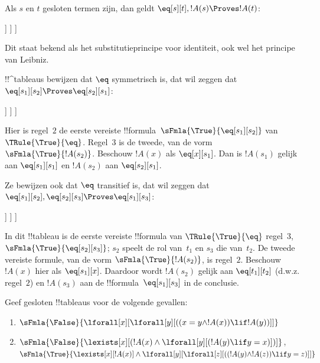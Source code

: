 \documentclass[openany]{memoir}
\begin{document}
\begin{ex}
Als $s$ en $t$ gesloten termen zijn, dan geldt
$\eq[s][t], !A(s) \Proves !A(t)$:
\begin{oltableau}
  [\sFmla{\False}{\formula{A}(t)}, just = \TAss
    [\sFmla{\True}{\eq[s][t]}, just = \TAss
      [\sFmla{\True}{\formula{A}(s)}, just = \TAss
        [\sFmla{\True}{\formula{A}(t)}, just={\TRule{\True}{\eq}[2, 3]}, close]
      ]
    ]
  ]
\end{oltableau}
Dit staat bekend als het substitutieprincipe voor identiteit, ook wel
het principe van Leibniz.

!!^{tableau}s bewijzen dat $\eq$ symmetrisch is, dat wil zeggen dat
$\eq[s_1][s_2] \Proves \eq[s_2][s_1]$:
\begin{oltableau}
  [\sFmla{\False}{\eq[s_2][s_1]}, just = \TAss
    [\sFmla{\True}{\eq[s_1][s_2]}, just = \TAss
      [\sFmla{\True}{\eq[s_1][s_1]}, just = {$\eq$}
        [\sFmla{\True}{\eq[s_2][s_1]}, just = {\TRule{\True}{\eq}[2, 3]}, close]
      ]
    ]
  ]
\end{oltableau}
Hier is regel~$2$ de eerste vereiste
!!{formula}~$\sFmla{\True}{\eq[s_1][s_2]}$ van
$\TRule{\True}{\eq}$. Regel~$3$ is de tweede, van de vorm
$\sFmla{\True}{!A(s_2)}$. Beschouw $!A(x)$ als $\eq[x][s_1]$. Dan is
$!A(s_1)$ gelijk aan $\eq[s_1][s_1]$ en $!A(s_2)$ aan
$\eq[s_2][s_1]$.

Ze bewijzen ook dat $\eq$ transitief is, dat wil zeggen dat
$\eq[s_1][s_2], \eq[s_2][s_3] \Proves \eq[s_1][s_3]$:
\begin{oltableau}
  [\sFmla{\False}{\eq[s_1][s_3]}, just = \TAss
    [\sFmla{\True}{\eq[s_1][s_2]}, just = \TAss
      [\sFmla{\True}{\eq[s_2][s_3]}, just = \TAss
        [\sFmla{\True}{\eq[s_1][s_3]}, just = {\TRule{\True}{\eq}[3, 2]}, close]
      ]
    ]
  ]
\end{oltableau}
In dit !!{tableau} is de eerste vereiste !!{formula} van
$\TRule{\True}{\eq}$ regel~$3$,
$\sFmla{\True}{\eq[s_2][s_3]}$; $s_2$ speelt de rol van~$t_1$ en
$s_3$ die van~$t_2$. De tweede vereiste formule, van de vorm
$\sFmla{\True}{!A(s_2)}$, is regel~$2$. Beschouw $!A(x)$ hier als
$\eq[s_1][x]$. Daardoor wordt $!A(s_2)$ gelijk aan
$\eq[t_1][t_2]$ (d.w.z. regel~$2$) en $!A(s_3)$ aan de
!!{formula}~$\eq[s_1][s_3]$ in de conclusie.
\end{ex}

\begin{prob}
Geef gesloten !!{tableau}s voor de volgende gevallen:
\begin{enumerate}
\item $\sFmla{\False}{\lforall[x][\lforall[y][((x = y \land !A(x))
      \lif !A(y))]]}$
\item $\sFmla{\False}{\lexists[x][(!A(x) \land
    \lforall[y][(!A(y) \lif y = x)])]}$,\\
  $\sFmla{\True}{\lexists[x][!A(x)] \land
    \lforall[y][\lforall[z][((!A(y) \land !A(z)) \lif y = z)]]}$
\end{enumerate}
\end{prob}
\endgroup
\end{document}
